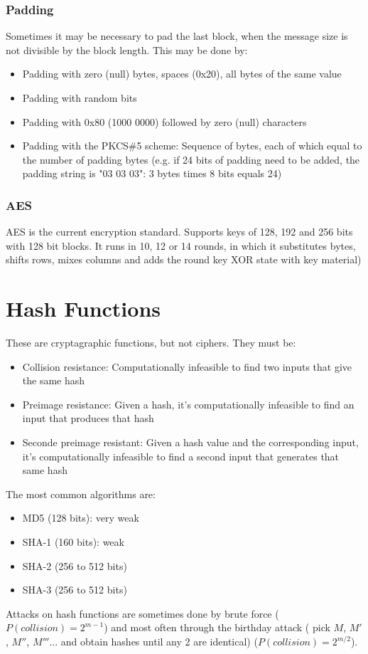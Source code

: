 \documentclass[10pt,a4paper]{report}
\begin{document}
\begin{itemize}
\begin{figure} [H]
\end{figure}
\end{itemize}
\subsubsection{Padding}
Sometimes it may be necessary to pad the last block, when the message size is not divisible by the block length. This may be done by:
\begin{itemize}
\item Padding with zero (null) bytes, spaces (0x20), all bytes of the same value
\item Padding with random bits
\item Padding with 0x80 (1000 0000) followed by zero (null) characters
\item Padding with the PKCS\#5 scheme: Sequence of bytes, each of which equal to the number of padding bytes (e.g.   if 24 bits of padding need to be added, the padding string is "03 03 03": 3 bytes times 8 bits equals 24)
\end{itemize}
\subsubsection{AES}
AES is the current encryption standard. Supports keys of 128, 192 and 256 bits with 128 bit blocks. It runs in 10, 12 or 14 rounds, in which it substitutes bytes, shifts rows, mixes columns and adds the round key XOR state with key material)
\section{Hash Functions}
These are cryptagraphic functions, but not ciphers. They must be:
\begin{itemize}
\item Collision resistance: Computationally infeasible to find two inputs that give the same hash
\item Preimage resistance: Given a hash, it’s computationally infeasible to find an input that produces that hash
\item Seconde preimage resistant: Given a hash value and the corresponding input, it’s computationally infeasible to find a second input that generates that same hash
\end{itemize}
The most common algorithms are:
\begin{itemize}
\item MD5 (128 bits): very weak
\item SHA-1 (160 bits): weak
\item SHA-2 (256 to 512 bits)
\item SHA-3 (256 to 512 bits)
\end{itemize}
Attacks on hash functions are sometimes done by brute force ($P(collision) = 2^{m-1}$) and most often through the birthday attack ( pick $M$, $M'$, $M''$, $M'''$... and obtain hashes until any 2 are identical) ($P(collision) = 2^{m/2}$).
\end{document}
